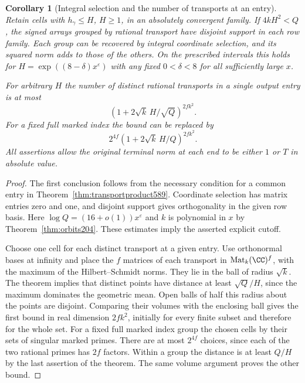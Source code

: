 \documentclass[a4paper,11pt]{article}
\newtheorem{corollary}[proposition]{Corollary}
\theoremstyle{definition}
\theoremstyle{remark}
\numberwithin{equation}{section}
\begin{document}
\begin{corollary}[Integral selection and the number of transports at an entry]
\leavevmode\label{cor:transportpacking589}
Retain cells with \(h_\gamma\le H\), \(H\ge1\), in an absolutely
convergent family. If \(4kH^2<Q\), the signed arrays grouped by
rational transport have disjoint support in each row family.
Each group can be recovered by integral coordinate selection,
and its squared norm adds to those of the others. On the
prescribed intervals this holds for
\(H=\exp((8-\delta)x^\varepsilon)\) with any fixed
\(0<\delta<8\) for all sufficiently large \(x\).

For arbitrary \(H\) the number of distinct rational transports
in a single output entry is at most
\[
             \left(1+2\sqrt{k}\,H/\sqrt Q\right)^{2fk^2}.
\]
For a fixed full marked index the bound can be replaced by
\[
                   2^{4f}\left(1+2\sqrt{k}\,H/Q\right)^{2fk^2}.
\]
All assertions allow the original terminal norm at each end
to be either \(1\) or \(T\) in absolute value.
\end{corollary}
\begin{proof}
The first conclusion follows from the necessary condition for
a common entry in Theorem~\ref{thm:transportproduct589}.
Coordinate selection has matrix entries zero and one, and
disjoint support gives orthogonality in the given row basis.
Here \(\log Q=(16+o(1))x^\varepsilon\) and \(k\) is polynomial
in \(x\) by Theorem~\ref{thm:orbits204}. These estimates imply
the asserted explicit cutoff.

Choose one cell for each distinct transport at a given entry.
Use orthonormal bases at infinity and place the \(f\) matrices
of each transport in \(\operatorname{Mat}_k(\CC)^f\), with
the maximum of the Hilbert--Schmidt norms. They lie in the
ball of radius \(\sqrt{k}\). The theorem implies that distinct
points have distance at least \(\sqrt Q/H\), since the maximum
dominates the geometric mean. Open balls of half this radius
about the points are disjoint. Comparing their volumes with
the enclosing ball gives the first bound in real dimension
\(2fk^2\), initially for every finite subset and therefore
for the whole set. For a fixed full marked index group the
chosen cells by their sets of singular marked primes. There
are at most \(2^{4f}\) choices, since each of the two rational
primes has \(2f\) factors. Within a group the distance is at
least \(Q/H\) by the last assertion of the theorem. The same
volume argument proves the other bound.
\end{proof}
\end{document}
